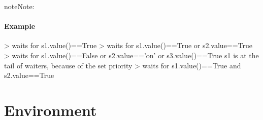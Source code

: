 \documentclass[letterpaper,10pt,english]{sphinxmanual}
\begin{document}
\begin{fulllineitems}
\begin{fulllineitems}
\begin{sphinxadmonition}{note}{Note:}
\begin{itemize}
\end{itemize}
\end{sphinxadmonition}
\paragraph{Example}

\textendash{}\textgreater{} waits for s1.value()==True 
\textendash{}\textgreater{} waits for s1.value()==True or s2.value==True 
\textendash{}\textgreater{} waits for s1.value()==False or s2.value==’on’ or s3.value()==True 
s1 is at the tail of waiters, because of the set priority 
\textendash{}\textgreater{} waits for s1.value()==True and s2.value==True 

\end{fulllineitems}


\end{fulllineitems}



\section{Environment}
\label{\detokenize{Reference:environment}}
\end{document}
